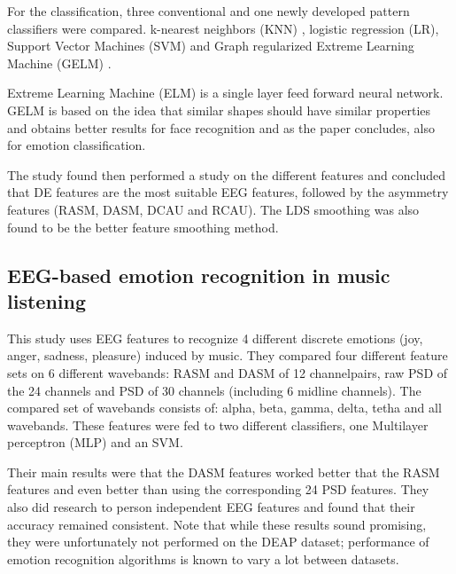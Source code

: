 For the classification, three conventional and one newly developed pattern classifiers were compared. k-nearest neighbors (KNN) , logistic regression (LR), Support Vector Machines (SVM) and Graph regularized Extreme Learning Machine (GELM) . 

\npar

Extreme Learning Machine (ELM)  is a single layer feed forward neural network\citep{ELMpaper}. GELM is based on the idea that similar shapes should have similar properties and obtains better results for face recognition \citep{GELMpaper} and as the paper concludes, also for emotion classification.

\npar

The study found then performed a study on the different features and concluded that DE features are the most suitable EEG features, followed by the asymmetry features (RASM, DASM, DCAU and RCAU). The LDS smoothing was also found to be the better feature smoothing method. 

\subsection{EEG-based emotion recognition in music listening}

This study\citep{emorecoghard} uses EEG features to recognize 4 different discrete emotions (joy, anger, sadness, pleasure) induced by music. They compared four different feature sets on 6 different wavebands: RASM and DASM of 12 channelpairs, raw PSD of the 24 channels and PSD of 30 channels (including 6 midline channels). The compared set of wavebands consists of: alpha, beta, gamma, delta, tetha and all wavebands. These features were fed to two different classifiers, one Multilayer perceptron (MLP)  and an SVM. 

\npar

Their main results were that the DASM features worked better that the RASM features and even better than using the corresponding 24 PSD features. They also did research to person independent EEG features and found that their accuracy remained consistent. Note that while these results sound promising, they were unfortunately not performed on the DEAP dataset; performance of emotion recognition algorithms is known to vary a lot between datasets\citep{PhytoEm}.

